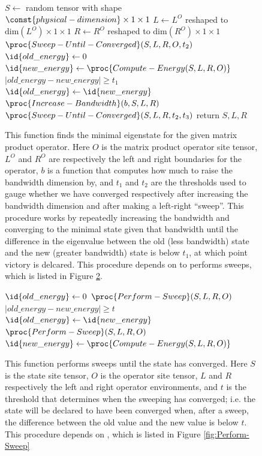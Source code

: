 \documentclass{article}
\begin{document}
\begin{figure}
\begin{codebox}
\li $S \gets$ random tensor with shape $\const{physical-dimension}\times1\times 1$
\li $L \gets L^O$ reshaped to $\text{dim}(L^O)\times1\times1$
\li $R \gets R^O$ reshaped to $\text{dim}(R^O)\times1\times1$
\li $\proc{Sweep-Until-Converged}(S,L,R,O,t_2)$
\li $\id{old\_energy} \gets 0$
\li $\id{new\_energy} \gets  \proc{Compute-Energy(S,L,R,O)}$
\li \While $|old\_energy-new\_energy| \ge t_1$
\li     \Do
\li         $\id{old\_energy} \gets \id{new\_energy}$
\li         $\proc{Increase-Bandwidth}(b,S,L,R)$
\li         $\proc{Sweep-Until-Converged}(S,L,R,t_2,t_3)$
\End
\li return $S,L,R$
\end{codebox}
\caption{\label{fig:Compute-Ground-State} This function finds the minimal eigenstate for the given matrix product operator.  Here $O$ is the matrix product operator site tensor, $L^O$ and $R^O$ are respectively the left and right boundaries for the operator, $b$ is a function that computes how much to raise the bandwidth dimension by, and $t_1$ and $t_2$ are the thresholds used to gauge whether we have converged respectively after increasing the bandwidth dimension and after making a left-right ``sweep''.  This procedure works by repeatedly increasing the bandwidth and converging to the minimal state given that bandwidth until the difference in the eigenvalue between the old (less bandwidth) state and the new (greater bandwidth) state is below $t_1$, at which point victory is delcared. This procedure depends on  to performs sweeps, which is listed in Figure \ref{fig:Sweep-Until-Converged}.}
\end{figure}

\begin{figure}
\begin{codebox}
\li $\id{old\_energy} \gets 0$
\li $\proc{Perform-Sweep}(S,L,R,O)$
\li \While $|old\_energy-new\_energy| \ge t$
\li     \Do
\li         $\id{old\_energy} \gets \id{new\_energy}$
\li         $\proc{Perform-Sweep}(S,L,R,O)$
\li         $\id{new\_energy} \gets  \proc{Compute-Energy(S,L,R,O)}$
\end{codebox}
\caption{\label{fig:Sweep-Until-Converged} This function performs sweeps until the state has converged. Here $S$ is the state site tensor, $O$ is the operator site tensor, $L$ and $R$ respectively the left and right operator environments, and $t$ is the threshold that determines when the sweeping has converged; i.e. the state will be declared to have been converged when, after a sweep, the difference between the old value and the new value is below $t$.  This procedure depends on , which is listed in Figure \ref{fig:Perform-Sweep}}
\end{figure}
\end{document}
